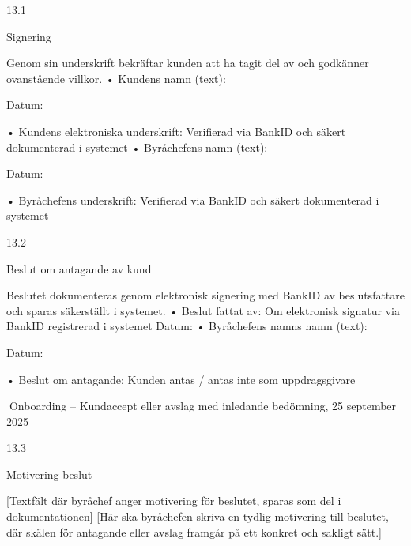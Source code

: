 13.1

Signering

Genom sin underskrift bekräftar kunden att ha tagit del av och godkänner ovanstående
villkor.
• Kundens namn (text):

Datum:

• Kundens elektroniska underskrift: Verifierad via BankID och säkert dokumenterad
i systemet
• Byråchefens namn (text):

Datum:

• Byråchefens underskrift: Verifierad via BankID och säkert dokumenterad i systemet

13.2

Beslut om antagande av kund

Beslutet dokumenteras genom elektronisk signering med BankID av beslutsfattare och
sparas säkerställt i systemet.
• Beslut fattat av: Om elektronisk signatur via BankID registrerad i systemet Datum:
• Byråchefens namns namn (text):

Datum:

• Beslut om antagande: Kunden antas / antas inte som uppdragsgivare

Onboarding – Kundaccept eller avslag med inledande bedömning,
25 september 2025

13.3

Motivering beslut

[Textfält där byråchef anger motivering för beslutet, sparas som del i dokumentationen]
[Här ska byråchefen skriva en tydlig motivering till beslutet, där skälen för antagande
eller avslag framgår på ett konkret och sakligt sätt.]

